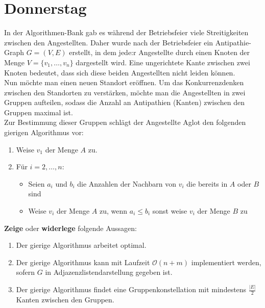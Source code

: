 \documentclass{uebung_cs}
\begin{document}
\section*{Donnerstag}
\begin{aufgabe}[Antipathien]
    In der Algorithmen-Bank gab es während der Betriebsfeier viele Streitigkeiten zwischen den Angestellten. Daher wurde nach der Betriebsfeier ein Antipathie-Graph $G=(V,E)$ erstellt, in dem jede:r Angestellte durch einen Knoten der Menge $V=\{v_1,\ldots , v_n\}$ dargestellt wird. Eine ungerichtete Kante zwischen zwei Knoten bedeutet, dass sich diese beiden Angestellten nicht leiden können.\\
    Nun möchte man einen neuen Standort eröffnen. Um das Konkurrenzdenken zwischen den Standorten zu verstärken, möchte man die Angestellten in zwei Gruppen aufteilen, sodass die Anzahl an Antipathien (Kanten) zwischen den Gruppen maximal ist.\\
    Zur Bestimmung dieser Gruppen schlägt der Angestellte Aglot den folgenden gierigen Algorithmus vor:
    \begin{enumerate}[1.]
        \item Weise $v_1$ der Menge $A$ zu.
        \item Für $i=2,\ldots , n$:
        \begin{itemize}
            \item Seien $a_i$ und $b_i$ die Anzahlen der Nachbarn von $v_i$ die bereits in $A$ oder $B$ sind
            \item Weise $v_i$ der Menge $A$ zu, wenn $a_i \leq b_i$ sonst weise $v_i$ der Menge $B$ zu 
        \end{itemize}
    \end{enumerate}
    \textbf{Zeige} oder \textbf{widerlege} folgende Aussagen:
    \begin{enumerate}
        \item Der gierige Algorithmus arbeitet optimal.
        \item Der gierige Algorithmus kann mit Laufzeit $\mathcal{O}(n+m)$ implementiert werden, sofern $G$ in Adjazenzlistendarstellung gegeben ist.
        \item Der gierige Algorithmus findet eine Gruppenkonstellation mit mindestens $\frac{|E|}{2}$ Kanten zwischen den Gruppen.
    \end{enumerate}
\end{aufgabe}
\end{document}
